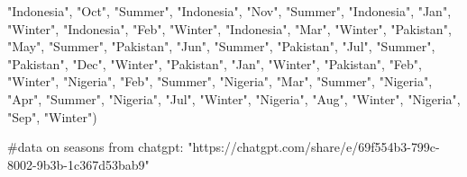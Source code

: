 \documentclass[
  letterpaper,
  DIV=11,
  numbers=noendperiod]{scrartcl}
\newenvironment{Shaded}{\begin{snugshade}}{\end{snugshade}}
\newcommand{\CommentTok}[1]{\textcolor[rgb]{0.37,0.37,0.37}{#1}}
\newcommand{\NormalTok}[1]{\textcolor[rgb]{0.00,0.23,0.31}{#1}}
\newcommand{\StringTok}[1]{\textcolor[rgb]{0.13,0.47,0.30}{#1}}
\begin{document}
\begin{Shaded}
\begin{Highlighting}[]
                         \StringTok{"Indonesia"}\NormalTok{, }\StringTok{"Oct"}\NormalTok{, }\StringTok{"Summer"}\NormalTok{,}
                         \StringTok{"Indonesia"}\NormalTok{, }\StringTok{"Nov"}\NormalTok{, }\StringTok{"Summer"}\NormalTok{,}
                         \StringTok{"Indonesia"}\NormalTok{, }\StringTok{"Jan"}\NormalTok{, }\StringTok{"Winter"}\NormalTok{,}
                         \StringTok{"Indonesia"}\NormalTok{, }\StringTok{"Feb"}\NormalTok{, }\StringTok{"Winter"}\NormalTok{,}
                         \StringTok{"Indonesia"}\NormalTok{, }\StringTok{"Mar"}\NormalTok{, }\StringTok{"Winter"}\NormalTok{,}
                         \StringTok{"Pakistan"}\NormalTok{, }\StringTok{"May"}\NormalTok{, }\StringTok{"Summer"}\NormalTok{,}
                         \StringTok{"Pakistan"}\NormalTok{, }\StringTok{"Jun"}\NormalTok{, }\StringTok{"Summer"}\NormalTok{,}
                         \StringTok{"Pakistan"}\NormalTok{, }\StringTok{"Jul"}\NormalTok{, }\StringTok{"Summer"}\NormalTok{,}
                         \StringTok{"Pakistan"}\NormalTok{, }\StringTok{"Dec"}\NormalTok{, }\StringTok{"Winter"}\NormalTok{,}
                         \StringTok{"Pakistan"}\NormalTok{, }\StringTok{"Jan"}\NormalTok{, }\StringTok{"Winter"}\NormalTok{,}
                         \StringTok{"Pakistan"}\NormalTok{, }\StringTok{"Feb"}\NormalTok{, }\StringTok{"Winter"}\NormalTok{,}
                         \StringTok{"Nigeria"}\NormalTok{, }\StringTok{"Feb"}\NormalTok{, }\StringTok{"Summer"}\NormalTok{,}
                         \StringTok{"Nigeria"}\NormalTok{, }\StringTok{"Mar"}\NormalTok{, }\StringTok{"Summer"}\NormalTok{,}
                         \StringTok{"Nigeria"}\NormalTok{, }\StringTok{"Apr"}\NormalTok{, }\StringTok{"Summer"}\NormalTok{,}
                         \StringTok{"Nigeria"}\NormalTok{, }\StringTok{"Jul"}\NormalTok{, }\StringTok{"Winter"}\NormalTok{,}
                         \StringTok{"Nigeria"}\NormalTok{, }\StringTok{"Aug"}\NormalTok{, }\StringTok{"Winter"}\NormalTok{,}
                         \StringTok{"Nigeria"}\NormalTok{, }\StringTok{"Sep"}\NormalTok{, }\StringTok{"Winter"}\NormalTok{)}

\CommentTok{\#data on seasons from chatgpt: "https://chatgpt.com/share/e/69f554b3{-}799c{-}8002{-}9b3b{-}1c367d53bab9"}
\end{Highlighting}
\end{Shaded}
\end{document}
